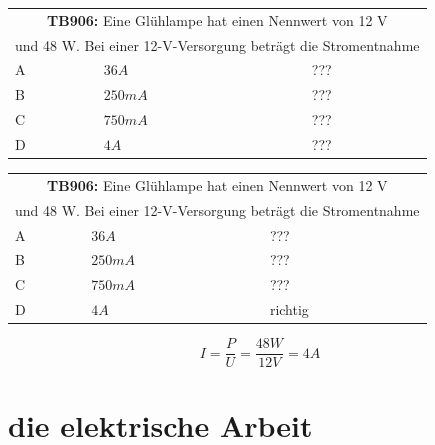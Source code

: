 \begin{frame}
	\begin{small}	
	\begin{tabular}{|l|l|l|}
	\hline
		\multicolumn{3}{|c|}{\textbf{TB906:} Eine Glühlampe hat einen Nennwert von 12 V }\\
		\multicolumn{3}{|c|}{und 48 W. Bei einer 12-V-Versorgung beträgt die Stromentnahme}\\
		\hline
		A & $36 A $ & ??? \\ \hline
		B & $250 mA $ & ??? \\ \hline
		C & $750 mA $ & ??? \\ \hline
		D & $4 A $ & ??? \\ \hline	
	\end{tabular}
	\end{small}
\end{frame}

\begin{frame}
	\begin{small}	
	\begin{tabular}{|l|l|l|}
	\hline
		\multicolumn{3}{|c|}{\textbf{TB906:} Eine Glühlampe hat einen Nennwert von 12 V }\\
		\multicolumn{3}{|c|}{und 48 W. Bei einer 12-V-Versorgung beträgt die Stromentnahme}\\
		\hline
		A & $36 A $ & ??? \\ \hline
		B & $250 mA $ & ??? \\ \hline
		C & $750 mA $ & ??? \\ \hline
		D & $4 A $ & richtig \\ \hline	
	\end{tabular}
	\end{small}
	\vspace{1cm}
	\begin{equation}
		I = \frac{P}{U} = \frac{48W}{12V} = 4A
	\end{equation}
\end{frame}

\section{die elektrische Arbeit}

